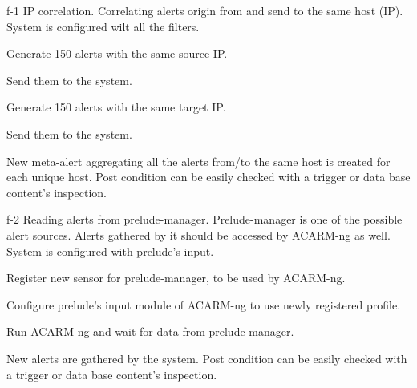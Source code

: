 \testCase
{f-1}
{IP correlation.}
{Correlating alerts origin from and send to the same host (IP).}
{System is configured wilt all the filters.}
{
\begin{enumerate*}
\item Generate 150 alerts with the same source IP.
\item Send them to the system.
\item Generate 150 alerts with the same target IP.
\item Send them to the system.
\end{enumerate*}
}
{New meta-alert aggregating all the alerts from/to the same host is created for each unique host.}
{Post condition can be easily checked with a trigger or data base content's inspection.}


\testCase
{f-2}
{Reading alerts from prelude-manager.}
{Prelude-manager is one of the possible alert sources. Alerts gathered by it should be accessed by ACARM-ng as well.}
{System is configured with prelude's input.}
{
\begin{enumerate*}
\item Register new sensor for prelude-manager, to be used by ACARM-ng.
\item Configure prelude's input module of ACARM-ng to use newly registered profile.
\item Run ACARM-ng and wait for data from prelude-manager.
\end{enumerate*}
}
{New alerts are gathered by the system.}
{Post condition can be easily checked with a trigger or data base content's inspection.}
